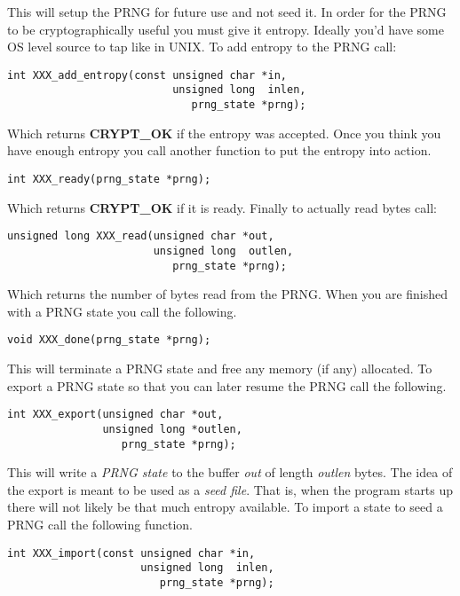 \documentclass[synpaper]{book}
\begin{document}
This will setup the PRNG for future use and not seed it.  In order for the PRNG to be cryptographically useful you must give it
entropy.  Ideally you'd have some OS level source to tap like in UNIX.  To add entropy to the PRNG call:
\begin{verbatim}
int XXX_add_entropy(const unsigned char *in,
                          unsigned long  inlen,
                             prng_state *prng);
\end{verbatim}
Which returns {\bf CRYPT\_OK} if the entropy was accepted.  Once you think you have enough entropy you call another
function to put the entropy into action.
\begin{verbatim}
int XXX_ready(prng_state *prng);
\end{verbatim}

Which returns {\bf CRYPT\_OK} if it is ready.  Finally to actually read bytes call:
\begin{verbatim}
unsigned long XXX_read(unsigned char *out,
                       unsigned long  outlen,
                          prng_state *prng);
\end{verbatim}

Which returns the number of bytes read from the PRNG.  When you are finished with a PRNG state you call
the following.

\begin{verbatim}
void XXX_done(prng_state *prng);
\end{verbatim}

This will terminate a PRNG state and free any memory (if any) allocated.  To export a PRNG state
so that you can later resume the PRNG call the following.

\begin{verbatim}
int XXX_export(unsigned char *out,
               unsigned long *outlen,
                  prng_state *prng);
\end{verbatim}

This will write a \textit{PRNG state} to the buffer \textit{out} of length \textit{outlen} bytes.  The idea of
the export is meant to be used as a \textit{seed file}.  That is, when the program starts up there will not likely
be that much entropy available.   To import a state to seed a PRNG call the following function.

\begin{verbatim}
int XXX_import(const unsigned char *in,
                     unsigned long  inlen,
                        prng_state *prng);
\end{verbatim}
\end{document}
